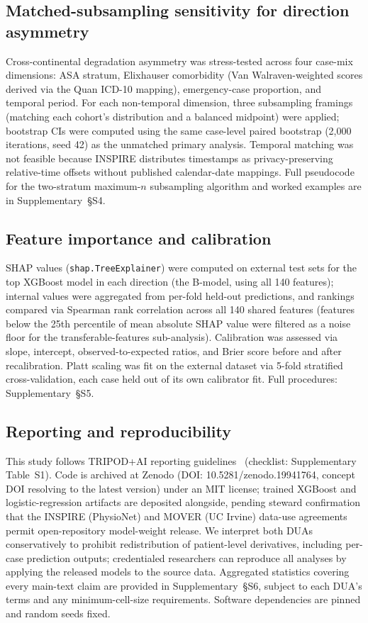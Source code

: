 \subsection{Matched-subsampling sensitivity for direction asymmetry}
\label{methods:casemixsensitivity}

Cross-continental degradation asymmetry was stress-tested across four case-mix dimensions: ASA stratum, Elixhauser comorbidity (Van Walraven-weighted scores derived via the Quan ICD-10 mapping), emergency-case proportion, and temporal period. For each non-temporal dimension, three subsampling framings (matching each cohort's distribution and a balanced midpoint) were applied; bootstrap CIs were computed using the same case-level paired bootstrap (2{,}000 iterations, seed 42) as the unmatched primary analysis. Temporal matching was not feasible because INSPIRE distributes timestamps as privacy-preserving relative-time offsets without published calendar-date mappings. Full pseudocode for the two-stratum maximum-$n$ subsampling algorithm and worked examples are in Supplementary~§S4.

\subsection{Feature importance and calibration}

SHAP values (\texttt{shap.TreeExplainer}) were computed on external test sets for the top XGBoost model in each direction (the B-model, using all 140 features); internal values were aggregated from per-fold held-out predictions, and rankings compared via Spearman rank correlation across all 140 shared features (features below the 25th percentile of mean absolute SHAP value were filtered as a noise floor for the transferable-features sub-analysis). Calibration was assessed via slope, intercept, observed-to-expected ratios, and Brier score before and after recalibration. Platt scaling was fit on the external dataset via 5-fold stratified cross-validation, each case held out of its own calibrator fit. Full procedures: Supplementary~§S5.

\subsection{Reporting and reproducibility}
\label{methods:reproducibility}

This study follows TRIPOD+AI reporting guidelines~\cite{Collins2024} (checklist: Supplementary Table~S1). Code is archived at Zenodo (DOI: 10.5281/zenodo.19941764, concept DOI resolving to the latest version) under an MIT license; trained XGBoost and logistic-regression artifacts are deposited alongside, pending steward confirmation that the INSPIRE (PhysioNet) and MOVER (UC Irvine) data-use agreements permit open-repository model-weight release. We interpret both DUAs conservatively to prohibit redistribution of patient-level derivatives, including per-case prediction outputs; credentialed researchers can reproduce all analyses by applying the released models to the source data. Aggregated statistics covering every main-text claim are provided in Supplementary~§S6, subject to each DUA's terms and any minimum-cell-size requirements. Software dependencies are pinned and random seeds fixed.

